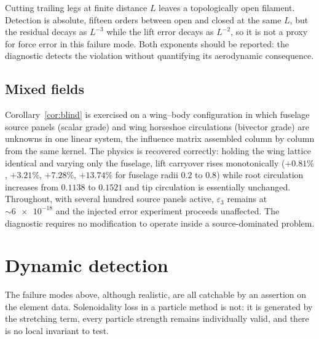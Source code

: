 \documentclass[preprint,12pt,3p]{elsarticle}
\theoremstyle{remark}
\newcommand{\eps}{\varepsilon_3}
\begin{document}
Cutting trailing legs at finite distance $L$ leaves a topologically open
filament. Detection is absolute, fifteen orders between open and closed at the
same $L$, but the residual decays as $L^{-3}$ while the lift error decays as
$L^{-2}$, so it is not a proxy for force error in this failure mode. Both
exponents should be reported: the diagnostic detects the violation without
quantifying its aerodynamic consequence.

\subsection{Mixed fields}
\label{sec:mixed}

Corollary~\ref{cor:blind} is exercised on a wing--body configuration in which
fuselage source panels (scalar grade) and wing horseshoe circulations (bivector
grade) are unknowns in one linear system, the influence matrix assembled column
by column from the same kernel. The physics is recovered correctly: holding the
wing lattice identical and varying only the fuselage, lift carryover rises
monotonically ($+0.81\%$, $+3.21\%$, $+7.28\%$, $+13.74\%$ for fuselage radii
$0.2$ to $0.8$) while root circulation increases from $0.1138$ to $0.1521$ and
tip circulation is essentially unchanged. Throughout, with several hundred
source panels active, $\eps$ remains at $\sim\!\num{6e-18}$ and the injected
error experiment proceeds unaffected. The diagnostic requires no modification to
operate inside a source-dominated problem.

\section{Dynamic detection}
\label{sec:dynamic}

The failure modes above, although realistic, are all catchable by an assertion
on the element data. Solenoidality loss in a particle method is not: it is
generated by the stretching term, every particle strength remains individually
valid, and there is no local invariant to test.
\end{document}
